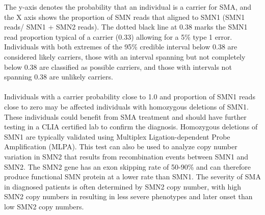 The y-axis denotes the probability that an individual is a carrier for SMA, and the X axis shows the proportion of SMN reads that aligned to SMN1 (SMN1 reads/ SMN1 + SMN2 reads). The dotted black line at 0.38 marks the SMN1 read proportion typical of a carrier (0.33) allowing for a 5\% type 1 error. Individuals with both extremes of the 95\% credible interval below 0.38 are considered likely carriers, those with an interval spanning but not completely below 0.38 are classified as possible carriers, and those with intervals not spanning 0.38 are unlikely carriers. 
\\ \\
Individuals with a carrier probability close to 1.0 and proportion of SMN1 reads close to zero may be affected individuals with homozygous deletions of SMN1. These individuals could benefit from SMA treatment and should have further testing in a CLIA certified lab to confirm the diagnosis. Homozygous deletions of SMN1 are typically validated using Multiplex Ligation-dependent Probe Amplification (MLPA). This test can also be used to analyze copy number variation in SMN2 that results from recombination events between SMN1 and SMN2. The SMN2 gene has an exon skipping rate of 50-90\% and can therefore produce functional SMN protein at a lower rate than SMN1. The severity of SMA in diagnosed patients is often determined by SMN2 copy number, with high SMN2 copy numbers in resulting in less severe phenotypes and later onset than low SMN2 copy numbers.

